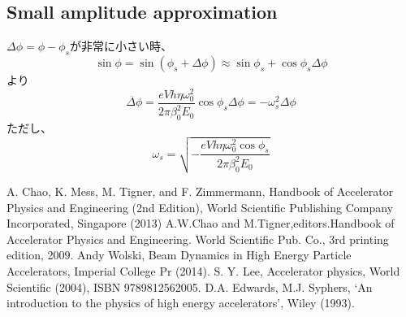 \documentclass[10pt,a4paper]{ltjsarticle}
\begin{document}
\subsection{Small amplitude approximation}
$\Delta\phi = \phi - \phi_s$が非常に小さい時、
%
\begin{equation}
    \sin\phi = \sin(\phi_s+\Delta\phi) \approx \sin\phi_s + \cos\phi_s \Delta\phi
\end{equation}
%
より
%
\begin{equation}
    \ddot{\Delta\phi} = \frac{e V h \eta \omega_0^2}{2\pi \beta_0^2 E_0} \cos\phi_s \Delta\phi = - \omega_s^2 \Delta\phi
\end{equation}
%
ただし、
%
\begin{equation}
    \omega_s = \sqrt{-\frac{e V h \eta \omega_0^2 \cos\phi_s}{2\pi \beta_0^2 E_0}}
\end{equation}
%
\begin{thebibliography}{9}
    A. Chao, K. Mess, M. Tigner, and F. Zimmermann, Handbook of Accelerator Physics and Engineering (2nd Edition), World Scientific Publishing Company Incorporated, Singapore (2013)
    A.W.Chao and M.Tigner,editors.Handbook of Accelerator Physics and Engineering. World Scientific Pub. Co., 3rd printing edition, 2009.
    Andy Wolski, Beam Dynamics in High Energy Particle Accelerators,  Imperial College Pr (2014).
    S. Y. Lee, Accelerator physics, World Scientific (2004), ISBN 9789812562005.
    D.A. Edwards, M.J. Syphers, `An introduction to the physics of high energy accelerators', Wiley (1993).
\end{thebibliography}
%
\end{document}

